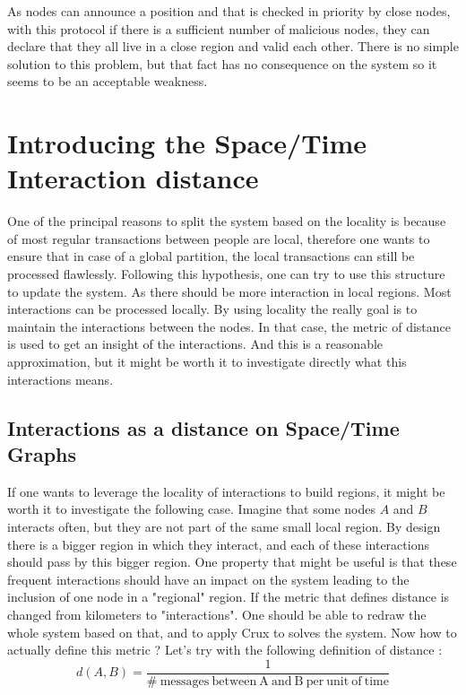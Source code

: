 \documentclass[a4paper,11pt,oneside]{report}
\begin{document}
As nodes can announce a position and that is checked in priority by close
nodes, with this protocol if there is a sufficient number of malicious nodes,
they can declare that they all live in a close region and valid each other.
There is no simple solution to this problem, but that fact has no consequence
on the system so it seems to be an acceptable weakness.

\section{Introducing the Space/Time Interaction distance}
One of the principal reasons to split the system based on the locality is
because of most regular transactions between people are local, therefore one
wants to ensure that in case of a global partition, the local transactions can
still be processed flawlessly. Following this hypothesis, one can try to use
this structure to update the system. As there should be more interaction in
local regions. Most interactions can be processed locally. By using locality
the really goal is to maintain the interactions between the nodes. In that
case, the metric of distance is used to get an insight of the interactions. And
this is a reasonable approximation, but it might be worth it to investigate
directly what this interactions means. 

\subsection{Interactions as a distance on Space/Time Graphs}

If one wants to leverage the locality of interactions to build regions, it
might be worth it to investigate the following case.  Imagine that some nodes
$A$ and $B$ interacts often, but they are not part of the same small local
region.  By design there is a bigger region in which they interact, and each of
these interactions should pass by this bigger region. One property that might
be useful is that these frequent interactions should have an impact on the
system leading to the inclusion of one node in a "regional" region. If the
metric that defines distance is changed from kilometers to "interactions". One
should be able to redraw the whole system based on that, and to apply Crux to
solves the system. Now how to actually define this metric ? Let's try with the
following definition of distance : \begin{equation} \label{definition-distance}
    d(A,B) = \frac{1}{ \mathrm{\#\ messages\ between\ A\ and\ B\ per\ unit\ of\ time} } 
\end{equation}
\end{document}
